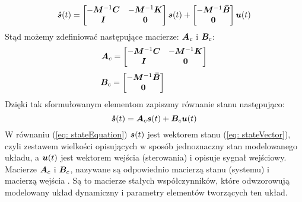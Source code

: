 \begin{equation}
	\bm{\dot{s}}(t) = 
		\begin{bmatrix}
		-\bm{M}^{-1}\bm{C} & -\bm{M}^{-1}\bm{K} \\
		\bm{I} & \bm{0}
		\end{bmatrix} \bm{s}(t) + 
	\begin{bmatrix}
		-\bm{M}^{-1}\bm{\bar{B}} \\
		\bm{0}
	\end{bmatrix} \bm{u}(t)
\end{equation}
Stąd możemy zdefiniować następujące macierze: $\bm{A}_c$ i $\bm{B}_c$:
\begin{equation}
	\bm{A}_c = 
	\begin{bmatrix}
		-\bm{M}^{-1}\bm{C} & -\bm{M}^{-1}\bm{K} \\
		\bm{I} & \bm{0}
	\end{bmatrix} 
\end{equation}
\begin{equation}
\bm{B}_c = 
	\begin{bmatrix}
		-\bm{M}^{-1}\bm{\bar{B}} \\
		\bm{0}
	\end{bmatrix}\phantom{\qquad\qquad\quad}
\end{equation}
Dzięki tak sformułowanym elementom zapiszmy równanie stanu  następująco:
\begin{equation} \label{eq: stateEquation}
\bm{\dot{s}}(t)= \bm{A}_c\bm{s}(t)+\bm{B}_c\bm{u}(t)
\end{equation}
W równaniu (\ref{eq: stateEquation}) $\bm{s}(t)$ jest wektorem stanu (\ref{eq: stateVector}), czyli zestawem wielkości opisujących w sposób jednoznaczny stan modelowanego układu, a $\bm{u}(t)$ jest wektorem wejścia (sterowania) i opisuje sygnał wejściowy. Macierze $\bm{A}_c$ i $\bm{B}_c$, nazywane są odpowiednio macierzą stanu (systemu)  i macierzą wejścia . Są to macierze stałych współczynników, które odwzorowują modelowany układ dynamiczny i parametry elementów tworzących ten układ.

